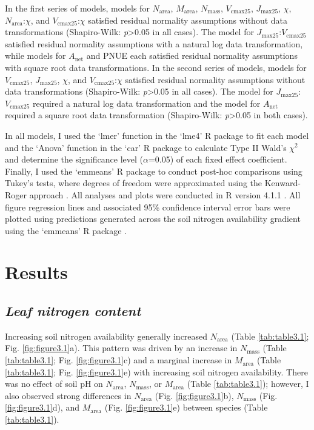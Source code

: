 In the first series of models, models for $N_\mathrm{area}$, $M_\mathrm{area}$, $N_\mathrm{mass}$, $V_\mathrm{cmax25}$, $J_\mathrm{max25}$, $\chi$, $N_{\mathrm{area}}$:$\chi$, and $V_\mathrm{cmax25}$:$\chi$ satisfied residual normality assumptions without data transformations (Shapiro-Wilk: \textit{p}>0.05 in all cases). The model for $J_\mathrm{max25}$:$V_\mathrm{cmax25}$ satisfied residual normality assumptions with a natural log data transformation, while models for $A_\mathrm{net}$ and PNUE each satisfied residual normality assumptions with square root data transformations. In the second series of models, models for $V_\mathrm{cmax25}$, $J_\mathrm{max25}$, $\chi$, and $V_\mathrm{cmax25}$:$\chi$ satisfied residual normality assumptions without data transformations (Shapiro-Wilk: \textit{p}>0.05 in all cases). The model for $J_\mathrm{max25}$:$V_\mathrm{cmax25}$ required a natural log data transformation and the model for $A_\mathrm{net}$ required a square root data transformation (Shapiro-Wilk: \textit{p}>0.05 in both cases).
    
In all models, I used the `lmer' function in the `lme4' R package  to fit each model and the `Anova' function in the `car' R package  to calculate Type II Wald’s $\chi^2$ and determine the significance level ($\alpha$=0.05) of each fixed effect coefficient. Finally, I used the `emmeans' R package  to conduct post-hoc comparisons using Tukey’s tests, where degrees of freedom were approximated using the Kenward-Roger approach . All analyses and plots were conducted in R version 4.1.1 . All figure regression lines and associated 95\% confidence interval error bars were plotted using predictions generated across the soil nitrogen availability gradient using the `emmeans' R package .
    
\section{Results}
\subsection{\textit{Leaf nitrogen content}}  
\noindent Increasing soil nitrogen availability generally increased $N_\mathrm{area}$ (Table \ref{tab:table3.1}; Fig. \ref{fig:figure3.1}a). This pattern was driven by an increase in $N_\mathrm{mass}$ (Table \ref{tab:table3.1}; Fig. \ref{fig:figure3.1}c) and a marginal increase in $M_\mathrm{area}$ (Table \ref{tab:table3.1}; Fig. \ref{fig:figure3.1}e) with increasing soil nitrogen availability. There was no effect of soil pH on $N_\mathrm{area}$, $N_\mathrm{mass}$, or $M_\mathrm{area}$ (Table \ref{tab:table3.1}); however, I also observed strong differences in $N_\mathrm{area}$ (Fig. \ref{fig:figure3.1}b), $N_\mathrm{mass}$ (Fig. \ref{fig:figure3.1}d), and $M_\mathrm{area}$ (Fig. \ref{fig:figure3.1}e) between species (Table \ref{tab:table3.1}).
\clearpage

